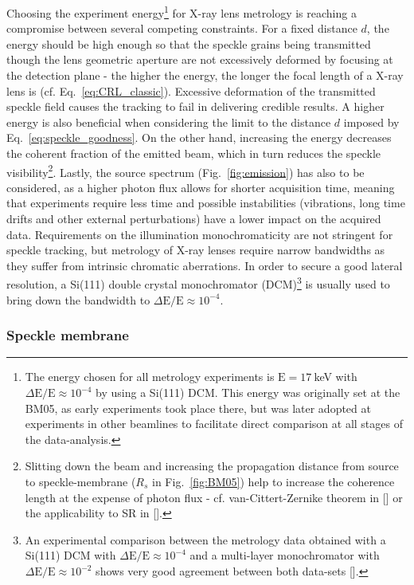 \begin{refsection}
Choosing the experiment energy\footnote{ The energy chosen for all metrology experiments is $\text{E}=17~$keV with $\Delta \text{E}/\text{E}\approx10^{-4}$ by using a Si(111) DCM. This energy was originally set at the BM05, as early experiments took place there, but was later adopted at experiments in other beamlines to facilitate direct comparison at all stages of the data-analysis.} for X-ray lens metrology is reaching a compromise between several competing constraints. For a fixed distance $d$, the energy should be high enough so that the speckle grains being transmitted though the lens geometric aperture are not excessively deformed by focusing at the detection plane - the higher the energy, the longer the focal length of a X-ray lens is (cf. Eq.~\ref{eq:CRL_classic}). Excessive deformation of the transmitted speckle field causes the tracking to fail in delivering credible results. A higher energy is also beneficial when considering the limit to the distance $d$ imposed by Eq.~\ref{eq:speckle_goodness}. On the other hand, increasing the energy decreases the coherent fraction of the emitted beam, which in turn reduces the speckle visibility\footnote{Slitting down the beam and increasing the propagation distance from source to speckle-membrane ($R_s$ in Fig.~\ref{fig:BM05}) help to increase the coherence length at the expense of photon flux - cf. van-Cittert-Zernike theorem in [\cite[\textit{§4.4.4}]{Mandel1995}] or the applicability to SR in [\cite[\textit{§4}]{Geloni2008}].}. Lastly, the source spectrum (Fig.~\ref{fig:emission}) has also to be considered, as a higher photon flux allows for shorter acquisition time, meaning that experiments require less time and possible instabilities (vibrations, long time drifts and other external perturbations) have a lower impact on the acquired data. Requirements on the illumination monochromaticity are not stringent for speckle tracking, but metrology of X-ray lenses require narrow bandwidths as they suffer from intrinsic chromatic aberrations. In order to secure a good lateral resolution, a Si(111) double crystal monochromator (DCM)\footnote{An experimental comparison between the metrology data obtained with a Si(111) DCM with $\Delta \text{E}/\text{E}\approx10^{-4}$ and a multi-layer monochromator with $\Delta \text{E}/\text{E}\approx10^{-2}$ shows very good agreement between both data-sets [\cite[\textit{\S3.3.3}]{Berujon2020a}].} is usually used to bring down the bandwidth to $\Delta \text{E}/\text{E}\approx10^{-4}$.

\subsubsection*{Speckle membrane}


\end{refsection}

